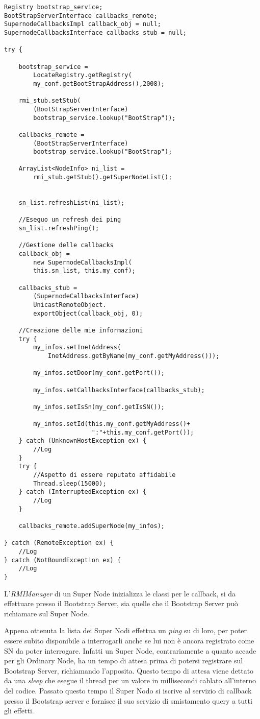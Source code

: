 \begin{lstlisting}
Registry bootstrap_service;
BootStrapServerInterface callbacks_remote;
SupernodeCallbacksImpl callback_obj = null;
SupernodeCallbacksInterface callbacks_stub = null;

try {
	
	bootstrap_service = 
		LocateRegistry.getRegistry(
		my_conf.getBootStrapAddress(),2008);
	
	rmi_stub.setStub(
		(BootStrapServerInterface) 
		bootstrap_service.lookup("BootStrap"));

	callbacks_remote = 
		(BootStrapServerInterface) 
		bootstrap_service.lookup("BootStrap");

	ArrayList<NodeInfo> ni_list = 
		rmi_stub.getStub().getSuperNodeList();
	
	
	sn_list.refreshList(ni_list);

	//Eseguo un refresh dei ping
	sn_list.refreshPing();
	
	//Gestione delle callbacks
	callback_obj = 
		new SupernodeCallbacksImpl(
		this.sn_list, this.my_conf);

	callbacks_stub = 
		(SupernodeCallbacksInterface) 
		UnicastRemoteObject.
		exportObject(callback_obj, 0);

	//Creazione delle mie informazioni
	try {
		my_infos.setInetAddress(
			InetAddress.getByName(my_conf.getMyAddress()));

		my_infos.setDoor(my_conf.getPort());

		my_infos.setCallbacksInterface(callbacks_stub);

		my_infos.setIsSn(my_conf.getIsSN());

		my_infos.setId(this.my_conf.getMyAddress()+
						":"+this.my_conf.getPort());
	} catch (UnknownHostException ex) {
		//Log
	}
	try {
		//Aspetto di essere reputato affidabile
		Thread.sleep(15000);
	} catch (InterruptedException ex) {
		//Log
	}

	callbacks_remote.addSuperNode(my_infos);

} catch (RemoteException ex) {
	//Log
} catch (NotBoundException ex) {
	//Log
}
\end{lstlisting}
L'\emph{RMIManager} di un Super Node inizializza le classi per le callback, si da effettuare presso il Bootstrap Server, sia quelle che il Bootstrap Server può richiamare sul Super Node.

Appena ottenuta la lista dei Super Nodi effettua un \emph{ping} su di loro, per poter essere subito disponibile a interrogarli anche se lui non è ancora registrato come SN da poter interrogare.
Infatti un Super Node, contrariamente a quanto accade per gli Ordinary Node, ha un tempo di attesa prima di potersi registrare sul Bootstrap Server, richiamando l'apposita. Questo tempo di attesa viene dettato da una \emph{sleep} che esegue il thread per un valore in millisecondi cablato all'interno del codice.
Passato questo tempo il Super Nodo si iscrive al servizio di callback presso il Bootstrap server e fornisce il suo servizio di smistamento query a tutti gli effetti.

